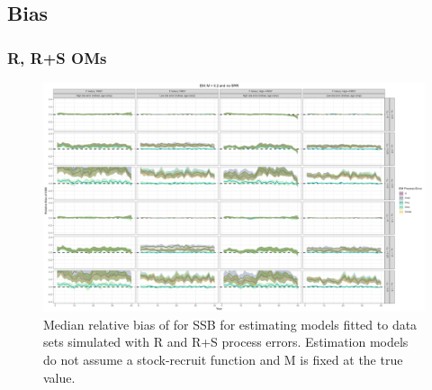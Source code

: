 \documentclass[
  12pt,
]{article}
\begin{document}
\clearpage

\hypertarget{bias-1}{%
\subsection*{Bias}\label{bias-1}}

\hypertarget{r-rs-oms}{%
\subsubsection*{R, R+S OMs}\label{r-rs-oms}}

\begin{landscape}
\begin{figure}
\caption{Median relative bias of for SSB for estimating models fitted to data sets simulated with R and R+S process errors.  Estimation models do not assume a stock-recruit function and M is fixed at the true value.}\label{naa_om_em_R_MF_relbias_ssb}
\begin{center}
\includegraphics[width = \textwidth]{naa_om_R_MF_relbias_ssb.png}
\end{center}
\end{figure}
\end{landscape}
\end{document}

